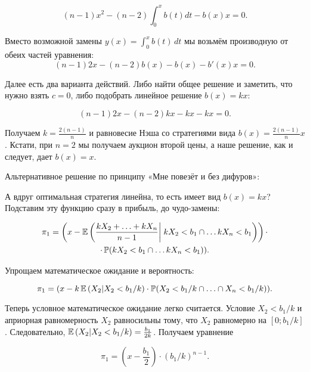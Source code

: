 \begin{enumerate}
\begin{equation}
(n-1)x^{2}-(n-2)\int_{0}^{x}b(t)dt -b(x)x=0.
\end{equation}

Вместо возможной замены $ y(x)=\int_{0}^{x}b(t) \, dt $ мы возьмём производную от обеих частей уравнения:
\begin{equation}
(n-1)2x-(n-2)b(x)-b(x)-b'(x)x=0.
\end{equation}

Далее есть два варианта действий. Либо найти общее решение и заметить, что нужно взять $ c=0 $, либо подобрать линейное решение $ b(x)=kx $:

\begin{equation}
(n-1)2x-(n-2)kx-kx-kx=0.
\end{equation}

Получаем $ k=\frac{2(n-1)}{n} $ и равновесие Нэша со стратегиями вида $ b(x)=\frac{2(n-1)}{n}x $. Кстати, при $ n=2 $ мы получаем аукцион второй цены, а наше решение, как и следует, дает $ b(x)=x $.

Альтернативное решение по принципу «Мне повезёт и без дифуров»:

А вдруг оптимальная стратегия линейна, то есть имеет вид $ b(x)=kx $? Подставим эту функцию сразу в прибыль, до чудо-замены:

\begin{multline}
\pi_{1}=\left(x-\E\left(\frac{kX_{2}+\ldots+kX_{n}}{n-1}\right|\left.\vphantom{\frac{kX_{2}+\ldots+kX_{n}}{n-1}}kX_{2}<b_{1}\cap \ldots kX_{n}<b_{1}\right)\right)\cdot \\
\cdot \P(kX_{2}<b_{1}\cap \ldots kX_{n}<b_{1})).
\end{multline}

Упрощаем математическое ожидание и вероятность:

\begin{equation}
\pi_{1}=(x-k\operatorname{\mathbb{E}}\left(X_{2}|X_{2}<b_{1}/k\right)\cdot \operatorname{\mathbb{P}}(X_{2}<b_{1}/k\cap \ldots \cap X_{n}<b_{1}/k)).
\end{equation}

Теперь условное математическое ожидание легко считается. Условие $ X_{2}<b_{1}/k $ и априорная равномерность $ X_{2} $ равносильны тому, что $ X_{2} $ равномерно на $ [0;b_{1}/k] $. Следовательно, $ \operatorname{\mathbb{E}}\left(X_{2}|X_{2}<b_{1}/k\right) = \frac{b_{1}}{2k} $. Получаем уравнение

\begin{equation}
\pi_{1}=\left( x-\frac{b_{1}}{2}\right)\cdot (b_{1}/k)^{n-1}.
\end{equation}


\end{enumerate}
